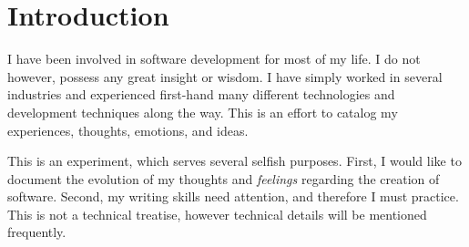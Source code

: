 \section{Introduction}
I have been involved in software development for most of my life. I do
not however, possess any great insight or wisdom. I have simply worked
in several industries and experienced first-hand many different
technologies and development techniques along the way. This is an
effort to catalog my experiences, thoughts, emotions, and ideas.

This is an experiment, which serves several selfish purposes. First, I
would like to document the evolution of my thoughts and
\emph{feelings} regarding the creation of software. Second, my writing
skills need attention, and therefore I must practice. This is not a technical
treatise, however technical details will be mentioned frequently.


